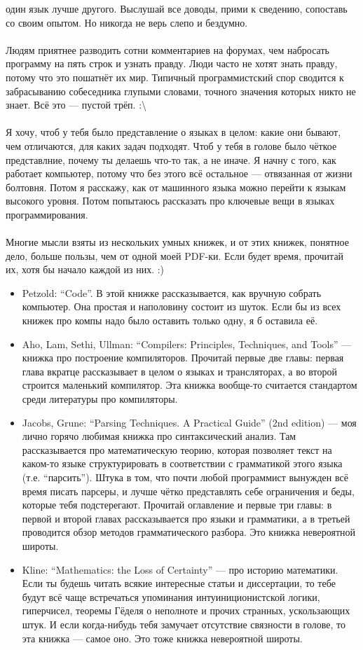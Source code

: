 \documentclass[11pt]{book}
\begin{document}
один язык лучше другого. Выслушай все доводы, прими к сведению, сопоставь со своим
опытом. Но никогда не верь слепо и бездумно.
\\ \\
Людям приятнее разводить сотни комментариев на форумах, чем набросать программу на пять
строк и узнать правду. Люди часто не хотят знать правду, потому что это пошатнёт
их мир. Типичный программистский спор сводится к забрасыванию собеседника глупыми
словами, точного значения которых никто не знает. Всё это --- пустой трёп. :\textbackslash
\\ \\
Я хочу, чтоб у тебя было представление о языках в целом: какие они бывают, чем
отличаются, для каких задач подходят. Чтоб у тебя в голове было чёткое представлние,
почему ты делаешь что-то так, а не иначе. Я начну с того, как работает компьютер, потому что
без этого всё остальное --- отвязанная от жизни болтовня. Потом я расскажу,
как от машинного языка можно перейти к языкам высокого уровня. Потом
попытаюсь рассказать про ключевые вещи в языках программирования.
\\ \\
Многие мысли взяты из нескольких умных книжек, и от этих книжек, понятное дело,
больше пользы, чем от одной моей PDF-ки. Если будет время, прочитай их, хотя
бы начало каждой из них. :)
\begin{itemize}
\item Petzold: ``Code''. В этой книжке рассказывается, как вручную собрать
компьютер. Она простая и наполовину состоит из шуток. Если бы из всех книжек
про компы надо было оставить только одну, я б оставила её.
\item Aho, Lam, Sethi, Ullman: ``Compilers: Principles, Techniques, and Tools'' --- книжка про построение
компиляторов. Прочитай первые две главы: первая глава вкратце рассказывает в целом о языках и трансляторах,
а во второй строится маленький компилятор. Эта книжка вообще-то считается
стандартом среди литературы про компиляторы.
\item Jacobs, Grune: ``Parsing Techniques. A Practical Guide'' (2nd edition) --- моя лично горячо любимая книжка про синтаксический анализ.
Там рассказывается про математическую теорию, которая позволяет текст на каком-то языке
структурировать в соответствии с грамматикой этого языка (т.е. ``парсить''). Штука в том,
что почти любой программист вынужден всё время писать парсеры, и лучше чётко представлять себе
ограничения и беды, которые тебя подстерегают. Прочитай оглавление и первые три главы: в первой
и второй главах рассказывается про языки и грамматики, а в третьей проводится обзор
методов грамматического разбора. Это книжка невероятной широты.
\item Kline: ``Mathematics: the Loss of Certainty'' --- про историю математики.
Если ты будешь читать всякие интересные статьи и диссертации, то тебе будут всё чаще
встречаться упоминания интуиниционистской логики, гиперчисел, теоремы Гёделя о неполноте
и прочих странных, ускользающих штук. И если когда-нибудь тебя замучает отсутствие
связности в голове, то эта книжка --- самое оно. Это тоже книжка невероятной широты.
\end{itemize}
\end{document}
